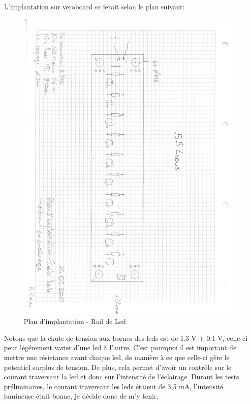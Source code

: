 L'implantation sur veroboard se ferait selon le plan suivant:
\begin{figure}[H]
    \centering
    \includegraphics[width=13cm, trim=0 0 3cm 1cm, clip]{assets/figures/plan_implantation_rail_led.pdf}
    \caption{Plan d'implantation - Rail de Led}
\end{figure}

Notons que la chute de tension aux bornes des leds est de 1.3 V $\pm$ 0.1 V, celle-ci peut légérement varier d'une led à l'autre. C'est
pourquoi il est important de mettre une résistance avant chaque led, de manière à ce que celle-ci gère le potentiel surplus de tension.
De plus, cela permet d'avoir un contrôle sur le courant traversant la led et donc sur l'intensité de l'éclairage. Durant les tests préliminaires,
le courant traversant les leds étaient de 3,5 \si{\milli\A}, l'intensité lumineuse était bonne, je décide donc de m'y tenir.

